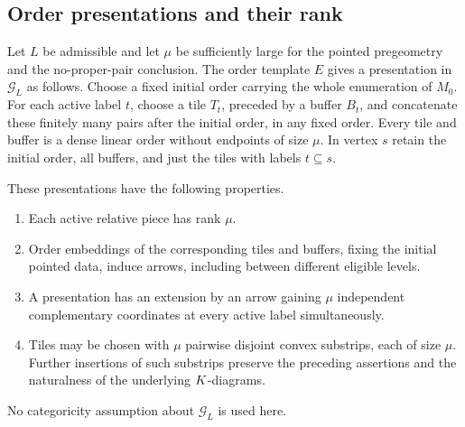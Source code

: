 \subsection{Order presentations and their rank}

\begin{proposition}
\label{sys:tiling}
Let $L$ be admissible and let $\mu$ be sufficiently large for the
pointed pregeometry and the no-proper-pair conclusion.  The order
template $E$ gives a presentation in $\mathcal G_L$ as follows.
Choose a fixed initial order carrying the whole enumeration of $M_0$.
For each active label $t$, choose a tile $T_t$, preceded by a buffer
$B_t$, and concatenate these finitely many pairs after the initial
order, in any fixed order.  Every tile and buffer is a dense linear
order without endpoints of size $\mu$.  In vertex $s$ retain the
initial order, all buffers, and just the tiles with labels $t\subseteq
s$.

These presentations have the following properties.
\begin{enumerate}
\item Each active relative piece has rank $\mu$.
\item Order embeddings of the corresponding tiles and buffers,
fixing the initial pointed data, induce arrows, including between
different eligible levels.
\item A presentation has an extension by an arrow gaining $\mu$
independent complementary coordinates at every active label
simultaneously.
\item Tiles may be chosen with $\mu$ pairwise disjoint convex
substrips, each of size $\mu$.  Further insertions of such substrips
preserve the preceding assertions and the naturalness of the
underlying $K$-diagrams.
\end{enumerate}
No categoricity assumption about $\mathcal G_L$ is used here.
\end{proposition}

